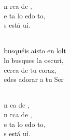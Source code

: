 \documentclass[12pt]{article}
\begin{document}
\begin{multicols*}{2}
\begin{cancion}
\begin{chorus}
	n rca de ,\\
	e ta lo edo to,\\
	s está uí.\\
	\end{chorus}%
	\jump\\
	 busquéis aisto en lolt\\
	 lo busques la oscuri,\\
	 cerca de   tu coraz,\\
	edes adorar a tu Ser\\\jump\\
	\begin{chorus}%
	n ca de , \\
	n rca de ,\\
	e ta lo edo to,\\
	s está uí.\\
	\end{chorus}%
	\jump\\
\end{cancion}%


\end{multicols*}
\end{document}
